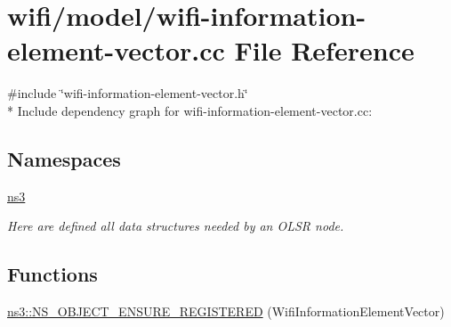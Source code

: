 \hypertarget{wifi-information-element-vector_8cc}{}\section{wifi/model/wifi-\/information-\/element-\/vector.cc File Reference}
\label{wifi-information-element-vector_8cc}
{\ttfamily \#include \char`\"{}wifi-\/information-\/element-\/vector.\+h\char`\"{}}\\*
Include dependency graph for wifi-\/information-\/element-\/vector.cc\+:
\subsection*{Namespaces}
\begin{DoxyCompactItemize}
\item 
 \hyperlink{namespacens3}{ns3}
\begin{DoxyCompactList}\small\item\em Here are defined all data structures needed by an O\+L\+SR node. \end{DoxyCompactList}\end{DoxyCompactItemize}
\subsection*{Functions}
\begin{DoxyCompactItemize}
\item 
\hyperlink{namespacens3_a0c1be618bef1d7133e7abc984ede54a9}{ns3\+::\+N\+S\+\_\+\+O\+B\+J\+E\+C\+T\+\_\+\+E\+N\+S\+U\+R\+E\+\_\+\+R\+E\+G\+I\+S\+T\+E\+R\+ED} (Wifi\+Information\+Element\+Vector)
\end{DoxyCompactItemize}
